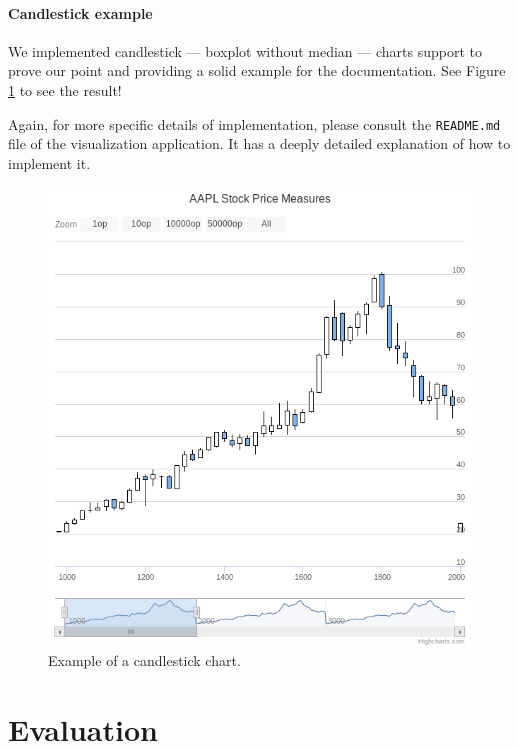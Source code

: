 \documentclass[a4paper,11pt]{report}
\begin{document}
\subsubsection{Candlestick example}

We implemented candlestick --- boxplot without median --- charts support to prove our point and providing a solid example for the documentation. See Figure \ref{candlestick} to see the result!

Again, for more specific details of implementation, please consult the \texttt{README.md} file of the visualization application. It has a deeply detailed explanation of how to implement it.

\begin{figure}[ht]
\begin{center}
\includegraphics[scale=0.45]{images/candlestick.png}
\caption{Example of a candlestick chart.}
\label{candlestick}
\end{center}
\end{figure}

\chapter{Evaluation}
\end{document}
